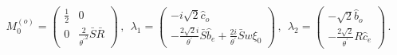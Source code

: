 \begin{equation}
M_{0}^{\left( o\right) }=\left( 
\begin{array}{cc}
{\frac{1}{2}} & 0 \\ 
0 & {\frac{2}{{\theta ^{\prime }}^{2}}}\bar{S}\bar{R}
\end{array}
\right) \,,~~\lambda _{1}=\left( 
\begin{array}{c}
-i\sqrt{2}\hat{c}_{o} \\ 
-{\frac{2\sqrt{2}i}{\theta ^{\prime }}}\bar{S}\hat{b}_{e}+{\frac{2i}{\theta
^{\prime }}}\bar{S}w\xi _{0}
\end{array}
\right) \,,~~\lambda _{2}=\left( 
\begin{array}{c}
-\sqrt{2}\hat{b}_{o} \\ 
-{\frac{2\sqrt{2}}{\theta ^{\prime }}}R\hat{c}_{e}
\end{array}
\right) \,.
\end{equation}

